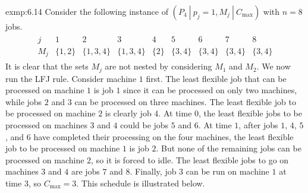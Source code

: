 \begin{exmp}{exmp:6.14}
    Consider the following instance of $(P_4~|~p_j=1, M_j~|~C_{\max})$ 
    with $n = 8$ jobs. 
    \begin{align*}
        \begin{array}{c|cccccccc}
            j & 1 & 2 & 3 & 4 & 5 & 6 & 7 & 8 \\ \hline 
            M_j & \{1,2\} & \{1,3,4\} & \{1,3,4\} & \{2\} & \{3,4\} 
            & \{3,4\} & \{3,4\} & \{3,4\}
        \end{array}
    \end{align*}
    It is clear that the sets $M_j$ are not nested by considering $M_1$ 
    and $M_2$. We now run the LFJ rule. Consider machine $1$ first. 
    The least flexible job that can be processed on machine $1$ is job $1$ 
    since it can be processed on only two machines, while jobs $2$ and $3$ 
    can be processed on three machines. The least flexible job to be processed 
    on machine $2$ is clearly job $4$. At time $0$, the least flexible jobs 
    to be processed on machines $3$ and $4$ could be jobs $5$ and $6$. 
    At time $1$, after jobs $1$, $4$, $5$, and $6$ have completed their processing 
    on the four machines, the least flexible job to be processed on machine 
    $1$ is job $2$. But none of the remaining jobs can be processed on 
    machine $2$, so it is forced to idle. The least flexible jobs to 
    go on machines $3$ and $4$ are jobs $7$ and $8$. Finally, job $3$ 
    can be run on machine $1$ at time $3$, so $C_{\max} = 3$. This schedule 
    is illustrated below. 
    \begin{center} 
\end{center}
\end{exmp}
